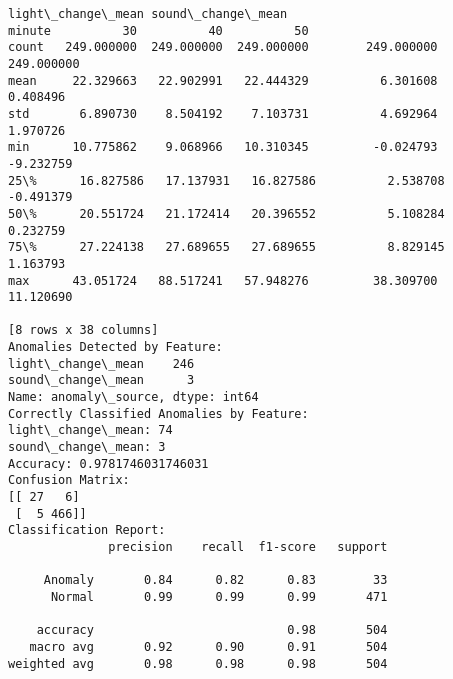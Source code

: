 \documentclass[11pt]{article}
\begin{document}
\begin{Verbatim}[commandchars=\\\{\}]
                                           light\_change\_mean sound\_change\_mean
minute          30          40          50
count   249.000000  249.000000  249.000000        249.000000        249.000000
mean     22.329663   22.902991   22.444329          6.301608          0.408496
std       6.890730    8.504192    7.103731          4.692964          1.970726
min      10.775862    9.068966   10.310345         -0.024793         -9.232759
25\%      16.827586   17.137931   16.827586          2.538708         -0.491379
50\%      20.551724   21.172414   20.396552          5.108284          0.232759
75\%      27.224138   27.689655   27.689655          8.829145          1.163793
max      43.051724   88.517241   57.948276         38.309700         11.120690

[8 rows x 38 columns]
Anomalies Detected by Feature:
light\_change\_mean    246
sound\_change\_mean      3
Name: anomaly\_source, dtype: int64
Correctly Classified Anomalies by Feature:
light\_change\_mean: 74
sound\_change\_mean: 3
Accuracy: 0.9781746031746031
Confusion Matrix:
[[ 27   6]
 [  5 466]]
Classification Report:
              precision    recall  f1-score   support

     Anomaly       0.84      0.82      0.83        33
      Normal       0.99      0.99      0.99       471

    accuracy                           0.98       504
   macro avg       0.92      0.90      0.91       504
weighted avg       0.98      0.98      0.98       504

    \end{Verbatim}

    \begin{center}
    \end{center}
    { \hspace*{\fill} \\}
    
\end{document}
